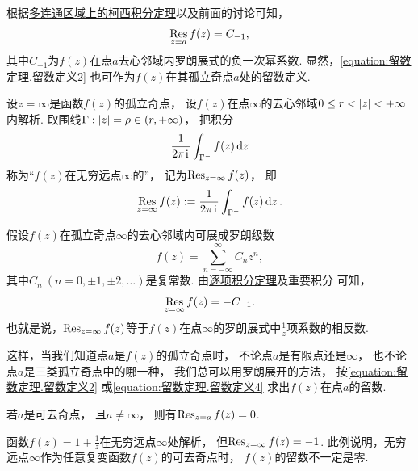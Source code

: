 根据\hyperref[theorem:解析函数的积分表示.多连通区域的柯西积分定理]{多连通区域上的柯西积分定理}以及前面的讨论可知，\begin{equation}\label{equation:留数定理.留数定义2}
	\operatorname*{Res}_{z=a} f(z) = C_{-1},
\end{equation}
其中\(C_{-1}\)为\(f(z)\)在点\(a\)去心邻域内罗朗展式的负一次幂系数.
显然，\cref{equation:留数定理.留数定义2} 也可作为\(f(z)\)在其孤立奇点\(a\)处的留数定义.

\begin{definition}
设\(z=\infty\)是函数\(f(z)\)的孤立奇点，
设\(f(z)\)在点\(\infty\)的去心邻域\(0 \leq r < \abs{z} < +\infty\)内解析.
取围线\(\Gamma: \abs{z} = \rho\in(r,+\infty)\)，
把积分\begin{equation*}
	\frac{1}{2\pi\kern1pt\mathrm{i}\kern1pt} \int_{\Gamma^-} f(z) \dd{z}
\end{equation*}称为“\(f(z)\)在无穷远点\(\infty\)的”，
记为\(\operatorname*{Res}_{z=\infty} f(z)\)，
即\begin{equation}\label{equation:留数定理.留数定义3}
	\operatorname*{Res}_{z=\infty} f(z)
	:=
	\frac{1}{2\pi\kern1pt\mathrm{i}\kern1pt} \int_{\Gamma^-} f(z) \dd{z}.
\end{equation}
\end{definition}

假设\(f(z)\)在孤立奇点\(\infty\)的去心邻域内可展成罗朗级数\begin{equation*}
	f(z) = \sum_{n=-\infty}^\infty C_n z^n,
\end{equation*}
其中\(C_n\ (n=0,\pm1,\pm2,\dotsc)\)是复常数.
由\hyperref[theorem:解析函数的级数表示.一致收敛级数的基本性质2]{逐项积分定理}及重要积分  可知，
\begin{equation}\label{equation:留数定理.留数定义4}
	\operatorname*{Res}_{z=\infty} f(z) = - C_{-1}.
\end{equation}
也就是说，\(\operatorname*{Res}_{z=\infty} f(z)\)等于\(f(z)\)在点\(\infty\)的罗朗展式中\(\frac{1}{z}\)项系数的相反数.

这样，当我们知道点\(a\)是\(f(z)\)的孤立奇点时，
不论点\(a\)是有限点还是\(\infty\)，
也不论点\(a\)是三类孤立奇点中的哪一种，
我们总可以用罗朗展开的方法，
按\cref{equation:留数定理.留数定义2}
或\cref{equation:留数定理.留数定义4}
求出\(f(z)\)在点\(a\)的留数.

\begin{property}
若\(a\)是可去奇点，
且\(a\neq\infty\)，
则有\(\operatorname*{Res}_{z=a} f(z) = 0\).
\end{property}

\begin{example}
函数\(f(z) = 1 + \frac{1}{z}\)在无穷远点\(\infty\)处解析，
但\(\operatorname*{Res}_{z=\infty} f(z) = -1\).
此例说明，无穷远点\(\infty\)作为任意复变函数\(f(z)\)的可去奇点时，
\(f(z)\)的留数不一定是零.
\end{example}

